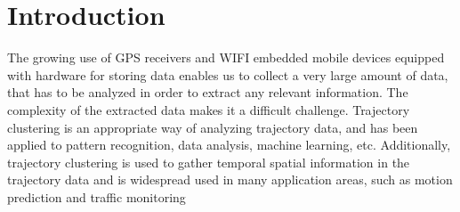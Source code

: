 \documentclass[a4paper, 12pt]{article}
\begin{document}



\tableofcontents

\listoffigures

\listofmyequations

\cleardoublepage


\section{Introduction}
The growing use of GPS receivers and WIFI embedded mobile devices equipped with hardware for storing data enables us to collect a very large amount of data, that has to be analyzed in order to extract any relevant information. The complexity of the extracted data makes it a difficult challenge. Trajectory clustering is an appropriate way of analyzing trajectory data, and has been applied to pattern recognition, data analysis, machine learning, etc. Additionally, trajectory clustering is used to gather temporal spatial information in the trajectory data and is widespread used in many application areas, such as motion prediction \citep{chen2010searching} and traffic monitoring \citep{atev2006learning}
\end{document}

